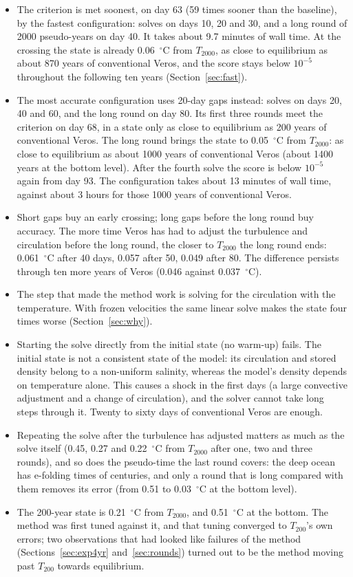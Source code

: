 \documentclass{article}
\begin{document}
\begin{itemize}
\item The criterion is met soonest, on day 63 (59 times sooner than the baseline), by the fastest configuration: solves on days 10, 20 and 30, and a long round of 2000 pseudo-years on day 40. It takes about 9.7 minutes of wall time. At the crossing the state is already 0.06~$^\circ$C from $T_{2000}$, as close to equilibrium as about 870 years of conventional Veros, and the score stays below $10^{-5}$ throughout the following ten years (Section~\ref{sec:fast}).
\item The most accurate configuration uses 20-day gaps instead: solves on days 20, 40 and 60, and the long round on day 80. Its first three rounds meet the criterion on day 68, in a state only as close to equilibrium as 200 years of conventional Veros. The long round brings the state to 0.05~$^\circ$C from $T_{2000}$: as close to equilibrium as about 1000 years of conventional Veros (about 1400 years at the bottom level). After the fourth solve the score is below $10^{-5}$ again from day 93. The configuration takes about 13 minutes of wall time, against about 3 hours for those 1000 years of conventional Veros.
\item Short gaps buy an early crossing; long gaps before the long round buy accuracy. The more time Veros has had to adjust the turbulence and circulation before the long round, the closer to $T_{2000}$ the long round ends: 0.061~$^\circ$C after 40 days, 0.057 after 50, 0.049 after 80. The difference persists through ten more years of Veros (0.046 against 0.037~$^\circ$C).
\item The step that made the method work is solving for the circulation with the temperature. With frozen velocities the same linear solve makes the state four times worse (Section~\ref{sec:why}).
\item Starting the solve directly from the initial state (no warm-up) fails. The initial state is not a consistent state of the model: its circulation and stored density belong to a non-uniform salinity, whereas the model's density depends on temperature alone. This causes a shock in the first days (a large convective adjustment and a change of circulation), and the solver cannot take long steps through it. Twenty to sixty days of conventional Veros are enough.
\item Repeating the solve after the turbulence has adjusted matters as much as the solve itself (0.45, 0.27 and 0.22~$^\circ$C from $T_{2000}$ after one, two and three rounds), and so does the pseudo-time the last round covers: the deep ocean has e-folding times of centuries, and only a round that is long compared with them removes its error (from 0.51 to 0.03~$^\circ$C at the bottom level).
\item The 200-year state is 0.21~$^\circ$C from $T_{2000}$, and 0.51~$^\circ$C at the bottom. The method was first tuned against it, and that tuning converged to $T_{200}$'s own errors; two observations that had looked like failures of the method (Sections~\ref{sec:exp4yr} and~\ref{sec:rounds}) turned out to be the method moving past $T_{200}$ towards equilibrium.
\end{itemize}
\end{document}
